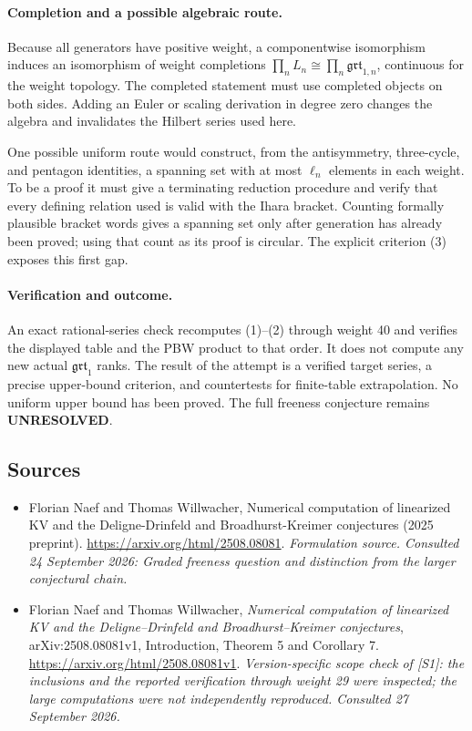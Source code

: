 \documentclass[11pt]{article}
\begin{document}
\paragraph{Completion and a possible algebraic route.}
Because all generators have positive weight, a componentwise
isomorphism induces an isomorphism of weight completions
$\prod_n L_n\cong\prod_n\mathfrak{grt}_{1,n}$, continuous for the
weight topology. The completed statement must use completed objects on
both sides. Adding an Euler or scaling derivation in degree zero changes
the algebra and invalidates the Hilbert series used here.

One possible uniform route would construct, from the antisymmetry,
three-cycle, and pentagon identities, a spanning set with at most
$\ell_n$ elements in each weight. To be a proof it must give a
terminating reduction procedure and verify that every defining relation
used is valid with the Ihara bracket. Counting formally plausible
bracket words gives a spanning set only after generation has already
been proved; using that count as its proof is circular. The explicit
criterion (3) exposes this first gap.

\paragraph{Verification and outcome.}
An exact rational-series check recomputes (1)--(2) through weight 40
and verifies the displayed table and the PBW product to that order.
It does not compute any new actual $\mathfrak{grt}_1$ ranks. The result
of the attempt is a verified target series, a precise upper-bound
criterion, and countertests for finite-table extrapolation. No uniform
upper bound has been proved. The full freeness conjecture remains
\textbf{UNRESOLVED}.

\subsection{Sources}
\begin{itemize}
\item[S1]Florian Naef and Thomas Willwacher, Numerical computation of linearized KV and the Deligne-Drinfeld and Broadhurst-Kreimer conjectures (2025 preprint).
\url{https://arxiv.org/html/2508.08081}.
\textit{Formulation source. Consulted 24 September 2026: Graded freeness question and distinction from the larger conjectural chain.}
\item[E1]Florian Naef and Thomas Willwacher, \emph{Numerical computation
of linearized KV and the Deligne--Drinfeld and Broadhurst--Kreimer
conjectures}, arXiv:2508.08081v1, Introduction, Theorem 5 and Corollary 7.
\url{https://arxiv.org/html/2508.08081v1}.
\textit{Version-specific scope check of [S1]: the inclusions and the
reported verification through weight 29 were inspected; the large
computations were not independently reproduced. Consulted 27 September 2026.}

\end{itemize}
\end{document}
